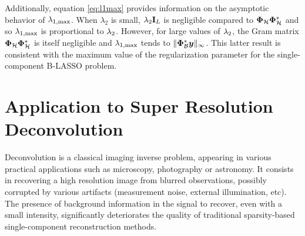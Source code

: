 \documentclass[12pt]{article}
\begin{document}

    Additionally, equation \eqref{eq:l1max} provides information on the asymptotic behavior of $\lambda_{1, \mathrm{max}}$. When $\lambda_2$ is small, $\lambda_{2} \mathbf{I}_L$ is negligible compared to $\bm{\Phi}_\mathcal{H} \bm{\Phi}_\mathcal{H}^*$ and so $\lambda_{1, \mathrm{max}}$ is proportional to $\lambda_{2}$. However, for large values of $\lambda_{2}$, the Gram matrix $\bm{\Phi}_\mathcal{H} \bm{\Phi}_\mathcal{H}^*$ is itself negligible and $\lambda_{1, \mathrm{max}}$ tends to $\lVert \bm{\Phi}_\mathcal{B}^* \bm{y}\rVert_\infty$. This latter result is consistent with the maximum value of the regularization parameter for the single-component B-LASSO problem.




% 


\section{Application to Super Resolution Deconvolution}
\label{sec:application}

    Deconvolution is a classical imaging inverse problem, appearing in various practical applications such as microscopy, photography or astronomy. It consists in recovering a high resolution image from blurred observations, possibly corrupted by various artifacts (measurement noise, external illumination, etc).
    The presence of background information in the signal to recover, even with a small intensity, significantly deteriorates the quality of traditional sparsity-based single-component reconstruction methods.
\end{document}
